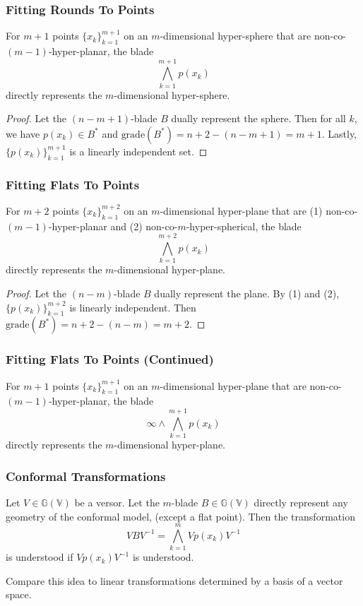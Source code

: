 \documentclass{beamer}
\newcommand{\G}{\mathbb{G}}
\newcommand{\V}{\mathbb{V}}
\newcommand{\nvai}{\infty}
\begin{document}
\begin{frame}
\frametitle{Fitting Rounds To Points}
\begin{lemma}
For $m+1$ points $\{x_k\}_{k=1}^{m+1}$ on an $m$-dimensional hyper-sphere that are non-co-$(m-1)$-hyper-planar,
the blade
\begin{equation*}
\bigwedge_{k=1}^{m+1} p(x_k)
\end{equation*}
\alert{directly} represents the $m$-dimensional hyper-sphere.
\end{lemma}
\begin{proof}
Let the $(n-m+1)$-blade $B$ \alert{dually} represent the sphere.  Then for all $k$, we have
$p(x_k)\in B^*$
and $\mbox{grade}(B^*)=n+2-(n-m+1)=m+1$.  Lastly, $\{p(x_k)\}_{k=1}^{m+1}$ is a linearly
independent set.
\end{proof}
\end{frame}

\begin{frame}
\frametitle{Fitting Flats To Points}
\begin{lemma}
For $m+2$ points $\{x_k\}_{k=1}^{m+2}$ on an $m$-dimensional hyper-plane that
are \alert{(1)} non-co-$(m-1)$-hyper-planar and \alert{(2)} non-co-$m$-hyper-spherical, the blade
\begin{equation*}
\bigwedge_{k=1}^{m+2} p(x_k)
\end{equation*}
\alert{directly} represents the $m$-dimensional hyper-plane.
\end{lemma}
\begin{proof}
Let the $(n-m)$-blade $B$ \alert{dually} represent the plane.  By \alert{(1)} and \alert{(2)},
$\{p(x_k)\}_{k=1}^{m+2}$ is linearly independent.  Then $\mbox{grade}(B^*)=n+2-(n-m)=m+2$.
\end{proof}
\end{frame}

\begin{frame}
\frametitle{Fitting Flats To Points (Continued)}
\begin{lemma}
For $m+1$ points $\{x_k\}_{k=1}^{m+1}$ on an $m$-dimensional hyper-plane that
are non-co-$(m-1)$-hyper-planar, the blade
\begin{equation*}
\nvai\wedge\bigwedge_{k=1}^{m+1} p(x_k)
\end{equation*}
\alert{directly} represents the $m$-dimensional hyper-plane.
\end{lemma}
\end{frame}

\begin{frame}
\frametitle{Conformal Transformations}
\begin{lemma}
Let $V\in\G(\V)$ be a versor.
Let the $m$-blade $B\in\G(\V)$ directly represent any
geometry of the conformal model, (except a flat point).  Then
the transformation
\begin{equation*}
VBV^{-1} = \bigwedge_{k=1}^m Vp(x_k)V^{-1}
\end{equation*}
is understood if $Vp(x_k)V^{-1}$ is understood.
\end{lemma}
Compare this idea to linear transformations determined
by a basis of a vector space.
\end{frame}
\end{document}
